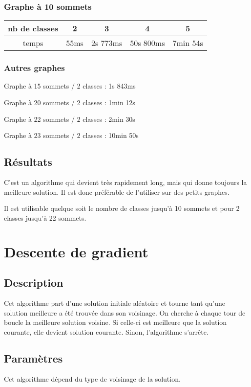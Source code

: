 \documentclass[12pt]{article}
\begin{document}
\subsubsection{Graphe à 10 sommets}

\begin{tabular}{|c|c|c|c|c|}
	\hline 
	nb de classes & 2 & 3 & 4 & 5 \\
	\hline
	temps & 55ms & 2s 773ms & 50s 800ms & 7min 54s \\
	\hline
\end{tabular}

\subsubsection{Autres graphes}
Graphe à 15 sommets / 2 classes : 1s 843ms

Graphe à 20 sommets / 2 classes : 1min 12s

Graphe à 22 sommets / 2 classes : 2min 30s

Graphe à 23 sommets / 2 classes : 10min 50s

\subsection{Résultats}
C'est un algorithme qui devient très rapidement long, mais qui donne toujours la meilleure solution. Il est donc préférable de l'utiliser sur des petits graphes.

Il est utilisable quelque soit le nombre de classes jusqu’à 10 sommets et pour 2 classes jusqu’à 22 sommets.

\newpage

\section{Descente de gradient}
\subsection{Description}
Cet algorithme part d’une solution initiale aléatoire et tourne tant qu’une solution meilleure a été trouvée dans son voisinage. On cherche à chaque tour de boucle la meilleure solution voisine. Si celle-ci est meilleure que la solution courante, elle devient solution courante. Sinon, l’algorithme s’arrête.

\subsection{Paramètres}
Cet algorithme dépend du type de voisinage de la solution. 
\end{document}
